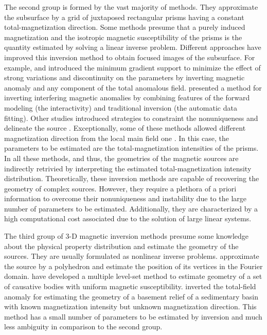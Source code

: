 The second group is formed by the vast majority of methods. 
They approximate the subsurface by a grid of juxtaposed rectangular prisms having 
a constant total-magnetization direction. Some methods presume that a purely induced 
magnetization \citep[e.g., ][]{cribb-1976,li_3-d_1996,pilkington_3-d_1997} and the 
isotropic magnetic susceptibility of the prisms is the quantity estimated by solving 
a linear inverse problem. Different approaches have improved this inversion method to obtain focused images of the subsurface. For example, \cite{portniaguine_focusing_1999} and \cite{portniaguine_3d_2002} introduced the minimum gradient support to minimize the effect of strong variations and discontinuity on the parameters by inverting magnetic anomaly and any component of the total anomalous field. \cite{barbosa_interactive_2006} presented a method for inverting interfering magnetic anomalies by combining  features of the forward modeling (the interactivity) and traditional inversion (the automatic data fitting). Other studies introduced strategies to constraint the nonuniqueness and delineate the source \cite[]{tontini,pilkington_3d_2009,shamsipour_3d_2011,cella_inversion_2012,abedi-2015}. Exceptionally, some of these methods allowed different magnetization direction from the local main field one \cite[e.g., ][]{pignatelli-2006}. 
In this case, the parameters to be estimated are the total-magnetization intensities 
of the prisms. 
In all these methods, and thus, the geometries of the magnetic sources are indirectly retrivied by interpreting the estimated total-magnetization intensity 
distribution. 
Theoretically, these inversion methods are capable of recovering the geometry of complex 
sources. However, they require a plethora of a priori information to overcome 
their nonuniqueness and instability due to the large number of parameters 
to be estimated. Additionally, they are characterized by a high 
computational cost associated due to the solution of large linear systems.

The third group of 3-D magnetic inversion methods presume some knowledge about the 
physical property distribution and estimate the geometry of the sources. 
They are usually formulated as nonlinear inverse problems. 
\citet{wang_inversion_1990} approximate the source by a polyhedron and estimate 
the position of its vertices in the Fourier domain. 
\citet{wenbin-2017} have developed a multiple level-set method to estimate geometry 
of a set of causative bodies with uniform magnetic susceptibility. \cite{hidalgo-2019} inverted the total-field anomaly for estimating the geometry of a basement relief of a sedimentary basin with known magnetization intensity but unknown magnetization direction. 
This method has a small number of parameters to be estimated by inversion and 
much less ambiguity in comparison to the second group. 

